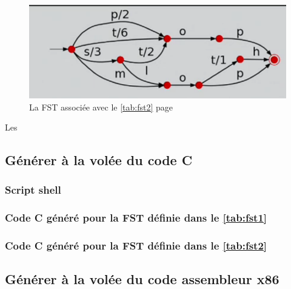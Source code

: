 \begin{figure}[!htb]
    \centering
    \includegraphics[scale=0.5]{../c_asm/2.png}
    \caption{La FST associée avec le \autoref{tab:fst2} page \pageref{tab:fst2}}
    \label{fig:fst-dico2}
\end{figure}
Les
\clearpage
\subsection{Générer à la volée du code C}
\label{sec:annexe:shell:c}
\subsubsection{Script shell}



\clearpage
\subsubsection{Code C généré pour la FST définie dans le \autoref{tab:fst1}}



\clearpage
\subsubsection{Code C généré pour la FST définie dans le \autoref{tab:fst2}}




\clearpage
\subsection{Générer à la volée du code assembleur x86}
\label{sec:annexe:shell:asm}
